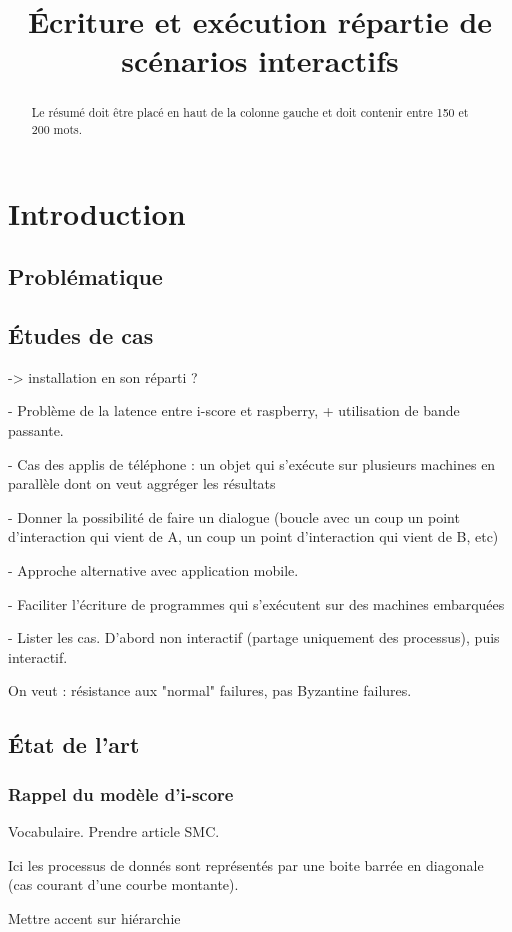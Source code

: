 \documentclass{article}
\title{Écriture et exécution répartie de scénarios interactifs}
\newcommand\trigger{point d'interaction\xspace}
\begin{document}
\maketitle
\begin{abstract}
Le résumé doit être placé en haut de la colonne gauche et doit contenir entre 150 et 200 mots.
\end{abstract}
\section{Introduction}
\subsection{Problématique}

\subsection{Études de cas}
-> installation en son réparti ?

- Problème de la latence entre i-score et raspberry, + utilisation de bande passante.

- Cas des applis de téléphone : un objet qui s'exécute sur plusieurs machines en parallèle dont on veut aggréger les résultats

- Donner la possibilité de faire un dialogue (boucle avec un coup un \trigger qui vient de A, un coup un \trigger qui vient de B, etc)

- Approche alternative avec application mobile.

- Faciliter l'écriture de programmes qui s'exécutent sur des machines embarquées

- Lister les cas. D'abord non interactif (partage uniquement des processus), puis interactif.

On veut : résistance aux "normal" failures, pas Byzantine failures.
\subsection{État de l'art}
\subsubsection{Rappel du modèle d'i-score}
Vocabulaire. Prendre article SMC.

Ici les processus de donnés sont représentés par une boite barrée en diagonale (cas courant d'une courbe montante).

Mettre accent sur hiérarchie
\end{document}
